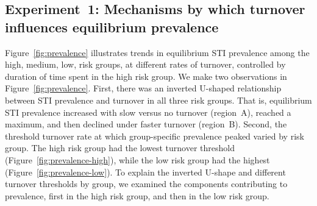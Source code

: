 \subsection{Experiment~1: Mechanisms by which turnover influences equilibrium prevalence}
\label{ss:res-prevalence}
Figure~\ref{fig:prevalence} illustrates trends in equilibrium STI prevalence  
among the high, medium, low, risk groups, at different rates of turnover,
controlled by duration of time spent in the high risk group.
We make two observations in Figure~\ref{fig:prevalence}.
First, there was an inverted U-shaped relationship
between STI prevalence and turnover in all three risk groups.
That is, equilibrium STI prevalence increased with slow versus no turnover (region~A),
reached a maximum, and then declined under faster turnover (region~B).
Second, the threshold turnover rate at which group-specific prevalence peaked
varied by risk group.
The high risk group had the lowest turnover threshold
(Figure~\ref{fig:prevalence-high}),
while the low risk group had the highest
(Figure~\ref{fig:prevalence-low}).
To explain the inverted U-shape and different turnover thresholds by group,
we examined the components contributing to prevalence,
first in the high risk group, and then in the low risk group.
